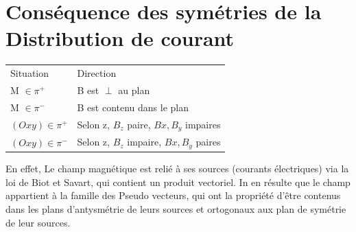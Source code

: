 \documentclass[french]{yLectureNote}
\renewcommand{\vec}{\overrightarrow}
\newcommand{\dd}{\mathrm{d}}
\newcommand{\norm}[1]{||\vec{#1}||}
\newcommand{\B}{\vec{B}(M)}
\newcommand{\pip}{\pi^+}
\newcommand{\pim}{\pi^-}
\begin{document}
\section{Conséquence des symétries de la Distribution de courant}
\begin{center}
\begin{tabular}{ll}
Situation & Direction\\
M \(\in \pip\) & B est \(\perp\) au plan\\
M \(\in \pim\) & B est contenu dans le plan\\
\( (Oxy) \in  \pip\) & Selon z, \(B_z\) paire, \(Bx,B_y\) impaires\\
\( (Oxy) \in  \pim\) & Selon z, \(B_z\) impaire, \(Bx,B_y\) paires
\end{tabular}
\end{center}
En effet, Le champ magnétique est relié à ses sources (courants électriques) via la loi de Biot et Savart, qui contient un produit vectoriel. In en résulte que le champ appartient à la famille des Pseudo vecteurs, qui ont la propriété d'\^etre contenus dans les plans d'antysmétrie de leurs sources et ortogonaux aux plan de symétrie de leur sources.
%
%
%
%
%
%
%
\end{document}
